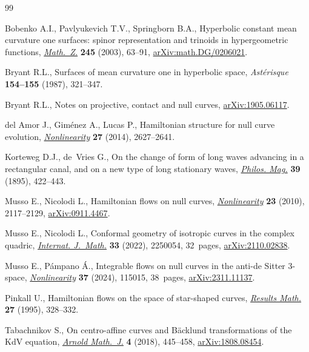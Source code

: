 \documentclass[pdftex]{sigma}
\numberwithin{equation}{section}
\begin{document}
\begin{thebibliography}{99}
\footnotesize\itemsep=0pt

Bobenko A.I., Pavlyukevich T.V., Springborn B.A., Hyperbolic constant mean
  curvature one surfaces: spinor representation and trinoids in hypergeometric
  functions, \href{https://doi.org/10.1007/s00209-003-0511-5}{\textit{Math.~Z.}} \textbf{245} (2003), 63--91,
  \href{https://arxiv.org/abs/math.DG/0206021}{arXiv:math.DG/0206021}.

Bryant R.L., Surfaces of mean curvature one in hyperbolic space,
  \textit{Ast\'erisque} \textbf{154--155} (1987), 321--347.

Bryant R.L., Notes on projective, contact and null curves, \href{https://arxiv.org/abs/1905.06117}{arXiv:1905.06117}.

del Amor J., Gim\'enez A., Lucas P., Hamiltonian structure for null curve
  evolution, \href{https://doi.org/10.1088/0951-7715/27/11/2627}{\textit{Nonlinearity}} \textbf{27} (2014), 2627--2641.

Korteweg D.J., de~Vries G., On the change of form of long waves advancing in a
  rectangular canal, and on a new type of long stationary waves,
  \href{https://doi.org/10.1080/14786449508620739}{\textit{Philos. Mag.}} \textbf{39} (1895), 422--443.

Musso E., Nicolodi L., Hamiltonian flows on null curves, \href{https://doi.org/10.1088/0951-7715/23/9/005}{\textit{Nonlinearity}}
  \textbf{23} (2010), 2117--2129, \href{https://arxiv.org/abs/0911.4467}{arXiv:0911.4467}.

Musso E., Nicolodi L., Conformal geometry of isotropic curves in the complex
  quadric, \href{https://doi.org/10.1142/S0129167X22500549}{\textit{Internat. J.~Math.}} \textbf{33} (2022), 2250054, 32~pages,
  \href{https://arxiv.org/abs/2110.02838}{arXiv:2110.02838}.

Musso E., P\'ampano {\'A}., Integrable flows on null curves in the anti-de
  {S}itter 3-space, \href{https://doi.org/10.1088/1361-6544/ad7d58}{\textit{Nonlinearity}} \textbf{37} (2024), 115015, 38~pages,
  \href{https://arxiv.org/abs/2311.11137}{arXiv:2311.11137}.

Pinkall U., Hamiltonian flows on the space of star-shaped curves,
  \href{https://doi.org/10.1007/BF03322836}{\textit{Results Math.}} \textbf{27} (1995), 328--332.

Tabachnikov S., On centro-affine curves and {B}\"acklund transformations of the
  {K}d{V} equation, \href{https://doi.org/10.1007/s40598-019-00105-y}{\textit{Arnold Math.~J.}} \textbf{4} (2018), 445--458,
  \href{https://arxiv.org/abs/1808.08454}{arXiv:1808.08454}.


\end{thebibliography}
\end{document}
